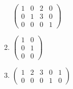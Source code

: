 \begin{example}
\begin{enumerate}
\begin{enumerate}
                  \begin{math}
                    \begin{pmatrix}
                      1 & 0 & 2 & 0 \\
                      0 & 1 & 3 & 0 \\
                      0 & 0 & 0 & 1
                    \end{pmatrix}
                  \end{math}

            \item

                  \begin{math}
                    \begin{pmatrix}
                      1 & 0 \\
                      0 & 1 \\
                      0 & 0
                    \end{pmatrix}
                  \end{math}


            \item

                  \begin{math}
                    \begin{pmatrix}
                      1 & 2 & 3 & 0 & 1 \\
                      0 & 0 & 0 & 1 & 0
                    \end{pmatrix}
                  \end{math}
          \end{enumerate}

  \end{enumerate}
\end{example}

\begin{remark}
  
\end{remark}